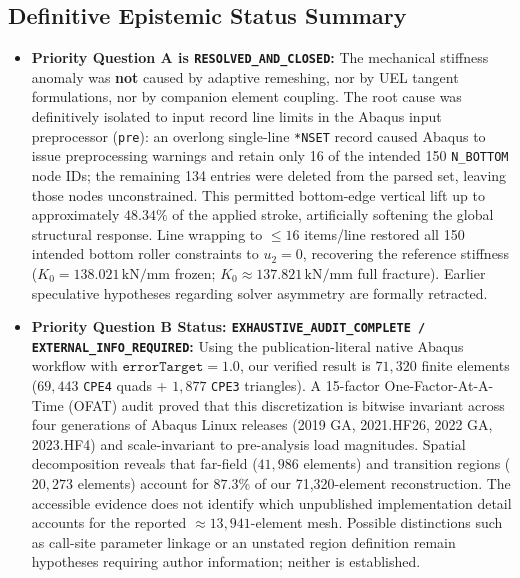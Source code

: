 \subsection{Definitive Epistemic Status Summary}
\begin{itemize}[leftmargin=4mm,itemsep=1.5pt,topsep=1pt]
  \item \textbf{Priority Question A is \texttt{RESOLVED\_AND\_CLOSED}:} 
  The mechanical stiffness anomaly was \textbf{not} caused by adaptive remeshing, nor by UEL tangent formulations, nor by companion element coupling. The root cause was definitively isolated to input record line limits in the Abaqus input preprocessor (\texttt{pre}): an overlong single-line \texttt{*NSET} record caused Abaqus to issue preprocessing warnings and retain only 16 of the intended 150 \texttt{N\_BOTTOM} node IDs; the remaining 134 entries were deleted from the parsed set, leaving those nodes unconstrained. This permitted bottom-edge vertical lift up to approximately $48.34\%$ of the applied stroke, artificially softening the global structural response. Line wrapping to $\le 16$ items/line restored all 150 intended bottom roller constraints to $u_2=0$, recovering the reference stiffness ($K_0 = 138.021\,\mathrm{kN/mm}$ frozen; $K_0 \approx 137.821\,\mathrm{kN/mm}$ full fracture). Earlier speculative hypotheses regarding solver asymmetry are formally retracted.
  
  \item \textbf{Priority Question B Status: \texttt{EXHAUSTIVE\_AUDIT\_COMPLETE / EXTERNAL\_INFO\_REQUIRED}:} 
  Using the publication-literal native Abaqus workflow with $\texttt{errorTarget}=1.0$, our verified result is $71{,}320$ finite elements ($69{,}443$ \texttt{CPE4} quads + $1{,}877$ \texttt{CPE3} triangles). A 15-factor One-Factor-At-A-Time (OFAT) audit proved that this discretization is bitwise invariant across four generations of Abaqus Linux releases (2019 GA, 2021.HF26, 2022 GA, 2023.HF4) and scale-invariant to pre-analysis load magnitudes. Spatial decomposition reveals that far-field ($41{,}986$ elements) and transition regions ($20{,}273$ elements) account for $87.3\%$ of our 71,320-element reconstruction. The accessible evidence does not identify which unpublished implementation detail accounts for the reported $\approx 13{,}941$-element mesh. Possible distinctions such as call-site parameter linkage or an unstated region definition remain hypotheses requiring author information; neither is established.
\end{itemize}

